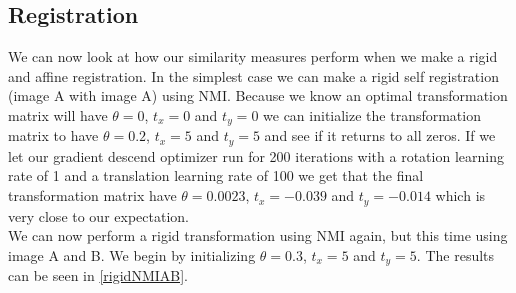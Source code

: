\subsection{Registration}
We can now look at how our similarity measures perform when we make a rigid and affine registration. In the simplest case we can make a rigid self registration (image A with image A) using NMI. Because we know an optimal transformation matrix will have $\theta = 0$, $t_x = 0$ and $t_y = 0$ we can initialize the transformation matrix to have $\theta = 0.2$, $t_x = 5$ and $t_y = 5$ and see if it returns to all zeros. If we let our gradient descend optimizer run for 200 iterations with a rotation learning rate of 1 and a translation learning rate of 100 we get that the final transformation matrix have $\theta =  0.0023$, $t_x = -0.039$ and $t_y = -0.014$ which is very close to our expectation.\\
We can now perform a rigid transformation using NMI again, but this time using image A and B. We begin by initializing $\theta = 0.3$, $t_x = 5$ and $t_y = 5$. The results can be seen in \autoref{rigidNMIAB}.

